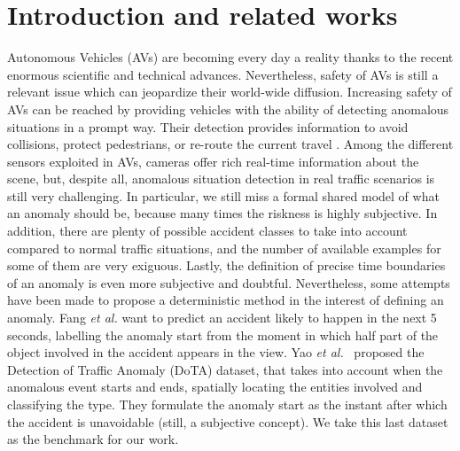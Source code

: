 \section{Introduction and related works}

Autonomous Vehicles (AVs) are becoming every day a reality thanks to the recent enormous scientific and technical advances.
Nevertheless, safety of AVs is still a relevant issue which can jeopardize their world-wide diffusion.
Increasing safety of AVs can be reached by providing vehicles with the ability of detecting anomalous situations in a prompt way.
Their detection provides information to avoid collisions, protect pedestrians, or re-route the current travel \cite{4298901}.
Among the different sensors exploited in AVs, cameras offer rich real-time information about the scene, but, despite all, anomalous situation detection in real traffic scenarios is still very challenging.
In particular, we still miss a formal shared model of what an anomaly should be, because many times the riskness is highly subjective.
In addition, there are plenty of possible accident classes to take into account compared to normal traffic situations, and the number of available examples for some of them are very exiguous.
Lastly, the definition of precise time boundaries of an anomaly is even more subjective and doubtful.
Nevertheless, some attempts have been made to propose a deterministic method in the interest of defining an anomaly.
Fang \emph{et al.} \cite{fang2019dada} want to predict an accident likely to happen in the next 5 seconds, labelling the anomaly start from the moment in which half part of the object involved in the accident appears in the view.
Yao \emph{et al.}~\cite{9712446} proposed the Detection of Traffic Anomaly (DoTA) dataset, that takes into account when the anomalous event starts and ends, spatially locating the entities involved and classifying the type.
They formulate the anomaly start as the instant after which the accident is unavoidable (still, a subjective concept).
We take this last dataset as the benchmark for our work.

